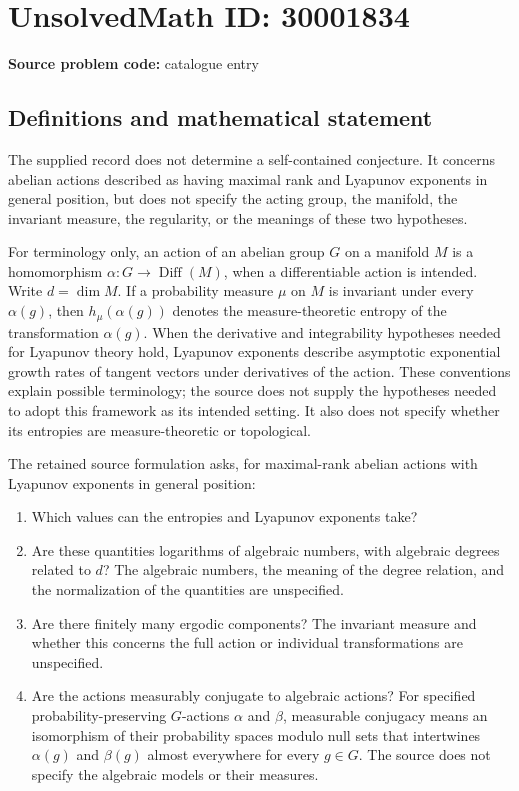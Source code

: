\documentclass[11pt]{article}
\begin{document}
\section*{UnsolvedMath ID: 30001834}
\textbf{Source problem code:} catalogue entry
\subsection{Definitions and mathematical statement}
The supplied record does not determine a self-contained conjecture. It concerns abelian actions described as having maximal rank and Lyapunov exponents in general position, but does not specify the acting group, the manifold, the invariant measure, the regularity, or the meanings of these two hypotheses.

For terminology only, an action of an abelian group \(G\) on a manifold \(M\) is a homomorphism \(\alpha:G\to\operatorname{Diff}(M)\), when a differentiable action is intended. Write \(d=\dim M\). If a probability measure \(\mu\) on \(M\) is invariant under every \(\alpha(g)\), then \(h_\mu(\alpha(g))\) denotes the measure-theoretic entropy of the transformation \(\alpha(g)\). When the derivative and integrability hypotheses needed for Lyapunov theory hold, Lyapunov exponents describe asymptotic exponential growth rates of tangent vectors under derivatives of the action. These conventions explain possible terminology; the source does not supply the hypotheses needed to adopt this framework as its intended setting. It also does not specify whether its entropies are measure-theoretic or topological.

The retained source formulation asks, for maximal-rank abelian actions with Lyapunov exponents in general position:
\begin{enumerate}
\item Which values can the entropies and Lyapunov exponents take?
\item Are these quantities logarithms of algebraic numbers, with algebraic degrees related to \(d\)? The algebraic numbers, the meaning of the degree relation, and the normalization of the quantities are unspecified.
\item Are there finitely many ergodic components? The invariant measure and whether this concerns the full action or individual transformations are unspecified.
\item Are the actions measurably conjugate to algebraic actions? For specified probability-preserving \(G\)-actions \(\alpha\) and \(\beta\), measurable conjugacy means an isomorphism of their probability spaces modulo null sets that intertwines \(\alpha(g)\) and \(\beta(g)\) almost everywhere for every \(g\in G\). The source does not specify the algebraic models or their measures.
\end{enumerate}
\end{document}
